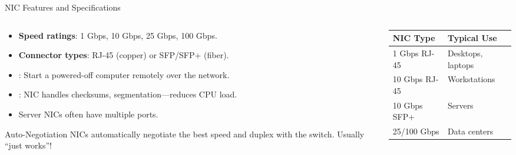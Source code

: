 \documentclass[aspectratio=169]{beamer}  %
\begin{document}
\begin{frame}{NIC Features and Specifications}
    \begin{columns}[T]
        \begin{column}{0.52\textwidth}
            \begin{itemize}
                \item \textbf{Speed ratings}: 1 Gbps, 10 Gbps, 25 Gbps, 100 Gbps.
                \item \textbf{Connector types}: RJ-45 (copper) or SFP/SFP+ (fiber).
                \item {}: Start a powered-off computer remotely over the network.
                \item {}: NIC handles checksums, segmentation---reduces CPU load.
                \item Server NICs often have multiple ports.
            \end{itemize}
            
            \vspace{0.3em}
            \begin{exampleblock}{Auto-Negotiation}
                NICs automatically negotiate the best speed and duplex with the switch. Usually ``just works''!
            \end{exampleblock}
        \end{column}
        \begin{column}{0.45\textwidth}
            \begin{center}
                \small
                \begin{tabular}{l l}
                    \toprule
                    \textbf{NIC Type} & \textbf{Typical Use} \\
                    \midrule
                    1 Gbps RJ-45 & Desktops, laptops \\
                    10 Gbps RJ-45 & Workstations \\
                    10 Gbps SFP+ & Servers \\
                    25/100 Gbps & Data centers \\
                    \bottomrule
                \end{tabular}
            \end{center}
            

\end{column}
\end{columns}
\end{frame}
\end{document}
